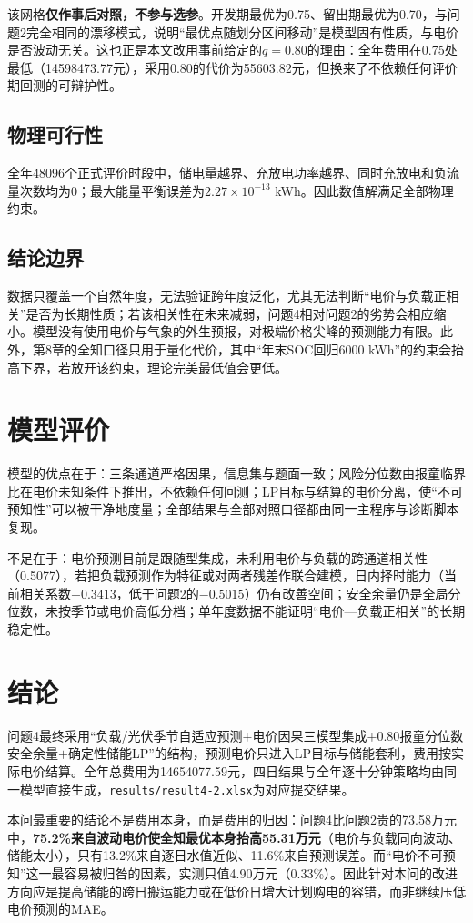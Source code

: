 \documentclass[UTF8,12pt]{ctexart}
\begin{document}
该网格\textbf{仅作事后对照，不参与选参}。开发期最优为0.75、留出期最优为0.70，与问题2完全相同的漂移模式，说明“最优点随划分区间移动”是模型固有性质，与电价是否波动无关。这也正是本文改用事前给定的$q=0.80$的理由：全年费用在0.75处最低（14598473.77元），采用0.80的代价为55603.82元，但换来了不依赖任何评价期回测的可辩护性。

\subsection{物理可行性}
全年48096个正式评价时段中，储电量越界、充放电功率越界、同时充放电和负流量次数均为0；最大能量平衡误差为$2.27\times10^{-13}$ kWh。因此数值解满足全部物理约束。

\subsection{结论边界}
数据只覆盖一个自然年度，无法验证跨年度泛化，尤其无法判断“电价与负载正相关”是否为长期性质；若该相关性在未来减弱，问题4相对问题2的劣势会相应缩小。模型没有使用电价与气象的外生预报，对极端价格尖峰的预测能力有限。此外，第8章的全知口径只用于量化代价，其中“年末SOC回归6000 kWh”的约束会抬高下界，若放开该约束，理论完美最低值会更低。

\section{模型评价}
模型的优点在于：三条通道严格因果，信息集与题面一致；风险分位数由报童临界比在电价未知条件下推出，不依赖任何回测；LP目标与结算的电价分离，使“不可预知性”可以被干净地度量；全部结果与全部对照口径都由同一主程序与诊断脚本复现。

不足在于：电价预测目前是跟随型集成，未利用电价与负载的跨通道相关性（0.5077），若把负载预测作为特征或对两者残差作联合建模，日内择时能力（当前相关系数$-0.3413$，低于问题2的$-0.5015$）仍有改善空间；安全余量仍是全局分位数，未按季节或电价高低分档；单年度数据不能证明“电价—负载正相关”的长期稳定性。

\section{结论}
问题4最终采用“负载/光伏季节自适应预测$+$电价因果三模型集成$+$0.80报童分位数安全余量$+$确定性储能LP”的结构，预测电价只进入LP目标与储能套利，费用按实际电价结算。全年总费用为14654077.59元，四日结果与全年逐十分钟策略均由同一模型直接生成，\texttt{results/result4-2.xlsx}为对应提交结果。

本问最重要的结论不是费用本身，而是费用的归因：问题4比问题2贵的73.58万元中，\textbf{75.2\%来自波动电价使全知最优本身抬高55.31万元}（电价与负载同向波动、储能太小），只有13.2\%来自逐日水值近似、11.6\%来自预测误差。而“电价不可预知”这一最容易被归咎的因素，实测只值4.90万元（0.33\%）。因此针对本问的改进方向应是提高储能的跨日搬运能力或在低价日增大计划购电的容错，而非继续压低电价预测的MAE。
\end{document}
